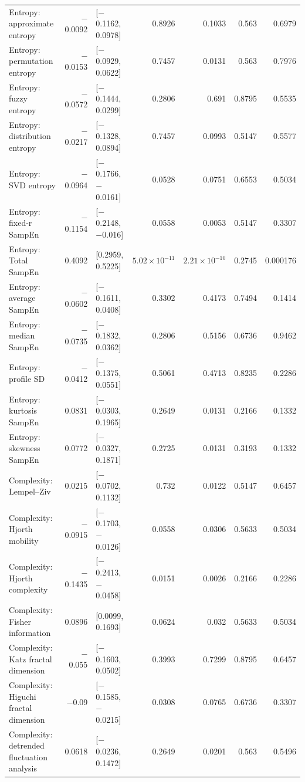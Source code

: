 \documentclass[10pt]{article}
\begin{document}
\begin{longtable}{p{5.2cm}rp{3.4cm}rrrr}
Entropy: approximate entropy & $-$0.0092 & [$-$0.1162, 0.0978] & 0.8926 & 0.1033 & 0.563 & 0.6979 \\
Entropy: permutation entropy & $-$0.0153 & [$-$0.0929, 0.0622] & 0.7457 & 0.0131 & 0.563 & 0.7976 \\
Entropy: fuzzy entropy & $-$0.0572 & [$-$0.1444, 0.0299] & 0.2806 & 0.691 & 0.8795 & 0.5535 \\
Entropy: distribution entropy & $-$0.0217 & [$-$0.1328, 0.0894] & 0.7457 & 0.0993 & 0.5147 & 0.5577 \\
Entropy: SVD entropy & $-$0.0964 & [$-$0.1766, $-$0.0161] & 0.0528 & 0.0751 & 0.6553 & 0.5034 \\
Entropy: fixed-r SampEn & $-$0.1154 & [$-$0.2148, $-$0.016] & 0.0558 & 0.0053 & 0.5147 & 0.3307 \\
Entropy: Total SampEn & 0.4092 & [0.2959, 0.5225] & $5.02\times10^{-11}$ & $2.21\times10^{-10}$ & 0.2745 & 0.000176 \\
Entropy: average SampEn & $-$0.0602 & [$-$0.1611, 0.0408] & 0.3302 & 0.4173 & 0.7494 & 0.1414 \\
Entropy: median SampEn & $-$0.0735 & [$-$0.1832, 0.0362] & 0.2806 & 0.5156 & 0.6736 & 0.9462 \\
Entropy: profile SD & $-$0.0412 & [$-$0.1375, 0.0551] & 0.5061 & 0.4713 & 0.8235 & 0.2286 \\
Entropy: kurtosis SampEn & 0.0831 & [$-$0.0303, 0.1965] & 0.2649 & 0.0131 & 0.2166 & 0.1332 \\
Entropy: skewness SampEn & 0.0772 & [$-$0.0327, 0.1871] & 0.2725 & 0.0131 & 0.3193 & 0.1332 \\
Complexity: Lempel--Ziv & 0.0215 & [$-$0.0702, 0.1132] & 0.732 & 0.0122 & 0.5147 & 0.6457 \\
Complexity: Hjorth mobility & $-$0.0915 & [$-$0.1703, $-$0.0126] & 0.0558 & 0.0306 & 0.5633 & 0.5034 \\
Complexity: Hjorth complexity & $-$0.1435 & [$-$0.2413, $-$0.0458] & 0.0151 & 0.0026 & 0.2166 & 0.2286 \\
Complexity: Fisher information & 0.0896 & [0.0099, 0.1693] & 0.0624 & 0.032 & 0.5633 & 0.5034 \\
Complexity: Katz fractal dimension & $-$0.055 & [$-$0.1603, 0.0502] & 0.3993 & 0.7299 & 0.8795 & 0.6457 \\
Complexity: Higuchi fractal dimension & $-$0.09 & [$-$0.1585, $-$0.0215] & 0.0308 & 0.0765 & 0.6736 & 0.3307 \\
Complexity: detrended fluctuation analysis & 0.0618 & [$-$0.0236, 0.1472] & 0.2649 & 0.0201 & 0.563 & 0.5496 \\
\bottomrule
\end{longtable}
\end{document}
